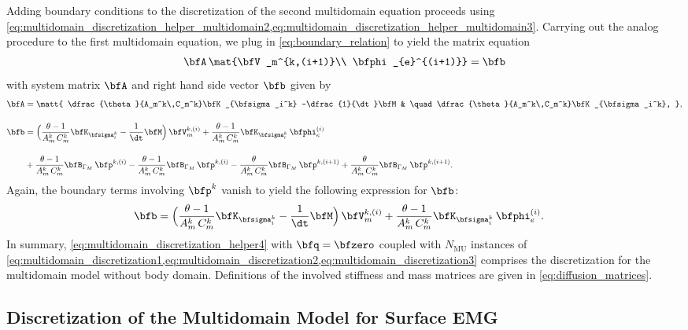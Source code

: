Adding boundary conditions to the discretization of the second multidomain equation proceeds using \cref{eq:multidomain_discretization_helper_multidomain2,eq:multidomain_discretization_helper_multidomain3}.
Carrying out the analog procedure to the first multidomain equation, we plug in \cref{eq:boundary_relation} to yield the matrix equation
\begin{align}\label{eq:multidomain_discretization1}
  \bfA\,\mat{\bfV_m^{k,(i+1)}\\ \bfphi_{e}^{(i+1)}} = \bfb
\end{align}
%
with system matrix $\bfA$ and right hand side vector $\bfb$ given by
%
\begin{align}
 \bfA &= \matt{
    \dfrac{\theta}{A_m^k\,C_m^k}\bfK_{\bfsigma_i^k} -\dfrac{1}{\dt}\bfM & \quad
    \dfrac{\theta}{A_m^k\,C_m^k}\bfK_{\bfsigma_i^k},
  },\label{eq:multidomain_discretization2} \\[4mm]
  \bfb &= \Big( \dfrac{\theta-1}{A_m^k\,C_m^k}\bfK_{\bfsigma_i^k} - \dfrac{1}{\dt}\bfM\Big)\,\bfV_m^{k,(i)} 
    + \dfrac{\theta - 1}{A_m^k\,C_m^k}\bfK_{\bfsigma_i^k}\,\bfphi_e^{(i)}\nonumber \\[4mm]
  & +\dfrac{\theta-1}{A_m^k\,C_m^k}\bfB_{\Gamma_M}\,\bfp^{k,(i)} - \dfrac{\theta-1}{A_m^k\,C_m^k}\bfB_{\Gamma_M}\,\bfp^{k,(i)}
  -\dfrac{\theta}{A_m^k\,C_m^k}\bfB_{\Gamma_M}\,\bfp^{k,(i+1)} + \dfrac{\theta}{A_m^k\,C_m^k}\bfB_{\Gamma_M}\,\bfp^{k,(i+1)}.\nonumber 
\end{align}
Again, the boundary terms involving $\bfp^k$ vanish to yield the following expression for $\bfb$:%
\begin{align}\label{eq:multidomain_discretization3}
    \bfb &= \Big( \dfrac{\theta-1}{A_m^k\,C_m^k}\bfK_{\bfsigma_i^k} - \dfrac{1}{\dt}\bfM\Big)\,\bfV_m^{k,(i)} 
      + \dfrac{\theta - 1}{A_m^k\,C_m^k}\bfK_{\bfsigma_i^k}\,\bfphi_e^{(i)}.
\end{align}
In summary, \cref{eq:multidomain_discretization_helper4} with $\bfq=\bfzero$ coupled with $N_\text{MU}$  instances of \cref{eq:multidomain_discretization1,eq:multidomain_discretization2,eq:multidomain_discretization3} comprises the discretization for the multidomain model without body domain. Definitions of the involved stiffness and mass matrices are given in \cref{eq:diffusion_matrices}.

\subsection{Discretization of the Multidomain Model for Surface EMG}\label{sec:discretization_body_domain}

